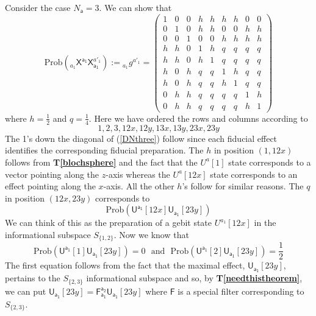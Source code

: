 \documentclass[10pt]{article}
\begin{document}
Consider the case $N_\mathsf{a}=3$.   We can show that
\begin{equation}\label{DNthree}
\text{Prob}({}_{a_1} \mathsf{X}^\mathsf{a_1}  \mathsf{X}_\mathsf{a_1}^{a'_1} ):= {}_{a_1} g^{a'_1}
=\left( \begin{array}{ccccccccc} 1&0&0&h&h&h&h&0&0 \\
                                  0&1&0&h&h&0&0&h&h \\
                                  0&0&1&0&0&h&h&h&h \\
                                  h&h&0&1&h&q&q&q&q \\
                                  h&h&0&h&1&q&q&q&q \\
                                  h&0&h&q&q&1&h&q&q \\
                                  h&0&h&q&q&h&1&q&q \\
                                  0&h&h&q&q&q&q&1&h \\
                                  0&h&h&q&q&q&q&h&1 \end{array} \right)
\end{equation}
where $h=\frac{1}{2}$ and $q=\frac{1}{4}$.  Here we have ordered the rows and columns according to
\begin{equation}
1, 2, 3, 12x, 12y, 13x, 13y, 23x, 23y
\end{equation}
The 1's down the diagonal of (\ref{DNthree}) follow since each fiducial effect identifies the corresponding fiducial preparation.   The $h$ in position $(1,12x)$ follows from {\bf T\ref{blochsphere}} and the fact that the $U^a[1]$ state corresponds to a vector pointing along the $z$-axis whereas the $U^a[12x]$ state corresponds to an effect pointing along the $x$-axis.  All the other $h$'s follow for similar reasons.  The $q$ in position $(12x,23y)$ corresponds to
\begin{equation}\label{forDmatrixone}
\text{Prob}(\mathsf{U^{a_1}}[12x] \mathsf{U_{a_1}}[23y])
\end{equation}
We can think of this as the preparation of a gebit state $U^{a_1}[12x]$ in the informational subspace $S_{\{1,2\} }$.  Now we know that
\begin{equation}\label{forDmatrixtwo}
\text{Prob}(\mathsf{U^{a_1}}[1] \mathsf{U_{a_1}}[23y])=0   ~~~\text{and} ~~~ \text{Prob}(\mathsf{U^{a_1}}[2] \mathsf{U_{a_1}}[23y])=\frac{1}{2}
\end{equation}
The first equation follows from the fact that the maximal effect, $\mathsf{U_{a_1}}[23y]$, pertains to the $S_{\{2,3\} }$ informational subspace and so, by {\bf T\ref{needthistheorem}}, we can put $\mathsf{U_{a_1}}[23y]= \mathsf{F_{a_1}^{a_2}} \mathsf{U_{a_1}}[23y]$ where $\mathsf F$ is a special filter corresponding to $S_{\{2,3\} }$.
\end{document}
